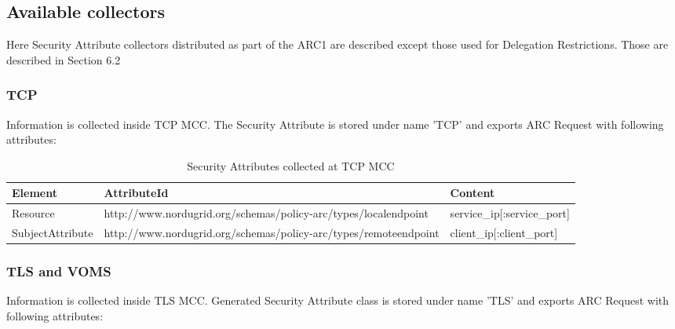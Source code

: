 \documentclass{book}
\begin{document}
\subsection{Available collectors} %
\label{subsec:sec_attr_avail_collectors}

Here Security Attribute collectors distributed as part of the ARC1 are described except those used for Delegation Restrictions. Those are described in Section 6.2

\subsubsection{TCP} %
\label{subsubsec:sec_attr_TCP}
Information is collected inside TCP MCC. The Security Attribute is stored under name 'TCP' and exports ARC Request with following attributes:

\begin{table}[ht]
\caption{Security Attributes collected at TCP MCC}
\centering
\begin{tabular}{| l | p{7cm} | p{5cm} |}
\hline
\textbf{Element} & \textbf{AttributeId} & \textbf{Content} \\ \hline
Resource & http://www.nordugrid.org/schemas/policy-arc/types/localendpoint & service\_ip[:service\_port] \\ \hline
SubjectAttribute & http://www.nordugrid.org/schemas/policy-arc/types/remoteendpoint & client\_ip[:client\_port] \\ \hline
\end{tabular}
\label{table:tcp_attr}
\end{table}


\subsubsection{TLS and VOMS} %
\label{subsubsec:sec_attr_TLS_VOMS}
Information is collected inside TLS MCC. Generated Security Attribute class is stored under name 'TLS' and exports ARC Request with following attributes:
\end{document}
